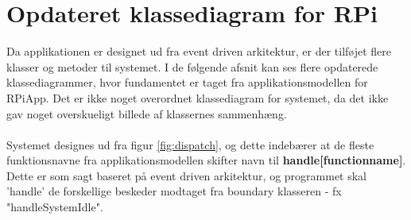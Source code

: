 \documentclass[Softwaredesign/Softwaredesign_main.tex]{subfiles}
\begin{document}
\section{Opdateret klassediagram for RPi}
Da applikationen er designet ud fra event driven arkitektur, er der tilføjet flere klasser og metoder til systemet. I de følgende afsnit kan ses flere opdaterede klassediagrammer, hvor fundamentet er taget fra applikationsmodellen for RPiApp. Det er ikke noget overordnet klassediagram for systemet, da det ikke gav noget overskueligt billede af klassernes sammenhæng. \\\\
Systemet designes ud fra figur \ref{fig:dispatch}, og dette indebærer at de fleste funktionsnavne fra applikationsmodellen skifter navn til \textbf{handle[functionname]}. Dette er som sagt baseret på event driven arkitektur, og programmet skal 'handle' de forskellige beskeder modtaget fra boundary klasseren - fx "handleSystemIdle".  
\end{document}
